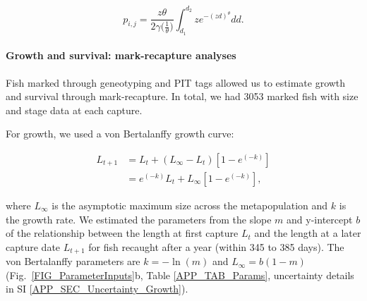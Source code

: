 \documentclass[12pt, oneside]{article}   	%
\begin{document}
\begin{equation} %
p_{i,j} = \frac{z\theta}{2\gamma({\frac{1}{\theta})}} \int_{d_1}^{d_2} z e^{-(zd)^\theta}  dd. \label{EQN_integratingDK}
\end{equation}

\paragraph*{Growth and survival: mark-recapture analyses}

Fish marked through geneotyping and PIT tags allowed us to estimate growth and survival through mark-recapture. In total, we had 3053 marked fish with size and stage data at each capture. 

For growth, we used a von Bertalanffy growth curve:

\begin{equation} \label{EQN_VBL} 
\begin{split}
L_{t+1} & = L_t + (L_\infty - L_t)[1 - e^{(-k)}] \\
 & = e^{(-k)}L_t + L_\infty[1 - e^{(-k)}],
\end{split}
\end{equation}

where $L_\infty$ is the asymptotic maximum size across the metapopulation and $k$ is the growth rate. We estimated the parameters from the slope $m$ and y-intercept $b$ of the relationship between the length at first capture $L_t$ and the length at a later capture date $L_{t+1}$ for fish recaught after a year (within 345 to 385 days). The von Bertalanffy parameters are $k = -\ln(m)$ and $L_\infty = b(1-m)$ \citep{hart2009estimating} (Fig.\ \ref{FIG_ParameterInputs}b, Table \ref{APP_TAB_Params}, uncertainty details in SI \ref{APP_SEC_Uncertainty_Growth}).
\end{document}
